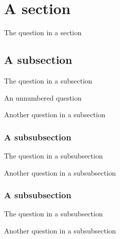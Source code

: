 \documentclass{scrartcl}
\begin{document}
\section{A section}

\begin{question}\label{qu:test}
The question in a section
\end{question}

\thequestion

\subsection{A subsection}

\begin{question}
The question in a subsection
\end{question}

\begin{question*}
An unnumbered question
\end{question*}

\begin{question}[label = lower-roman]\label{qu:test2}
Another question in a subsection
\end{question}

\thequestion

\subsubsection{A subsubsection}

\begin{question}\label{qu:test3}
The question in a subsubsection
\end{question}

\thequestion

\begin{question}
Another question in a subsubsection
\end{question}

\subsubsection{A subsubsection}

\begin{question}
The question in a subsubsection
\end{question}

\begin{question}
Another question in a subsubsection
\end{question}
\end{document}
